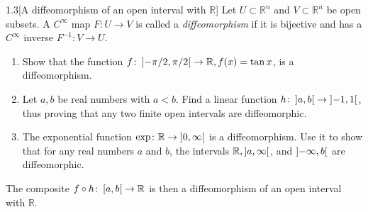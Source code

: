 \begin{problem}{1.3}[A diffeomorphism of an open interval with \(\mathbb{R}\)]
Let \(U\subset\mathbb{R}^{n}\) and \(V\subset\mathbb{R}^{n}\) be open subsets. A \(C^{\infty}\) map \(F\colon U\to V\) is called a \textit{diffeomorphism} if it is bijective and has a \(C^{\infty}\) inverse \(F^{-1}\colon V\to U\).
\begin{enumerate}[label={(\alph*)}]
    \item Show that the function \(f\colon\left\rbrack{-\pi/2,\pi/2}\right\lbrack\to\mathbb{R}, f(x)=\tan x\), is a diffeomorphism.
    \item Let \(a,b\) be real numbers with \(a<b\). Find a linear function \(h\colon\left\rbrack{a,b}\right\lbrack \to \left\rbrack{-1,1}\right\lbrack\), thus proving that any two finite open intervals are diffeomorphic.
    \item The exponential function \(\exp\colon\mathbb{R}\to\left\rbrack{0,\infty}\right\lbrack\) is a diffeomorphism. Use it to show that for any real numbers \(a\) and \(b\), the intervals \(\mathbb{R}, \left\rbrack{a,\infty}\right\lbrack\), and \(\left\rbrack{-\infty,b}\right\lbrack\) are diffeomorphic.
\end{enumerate}

The composite \(f\circ h\colon\left\lbrack{a,b}\right\lbrack\to\mathbb{R}\) is then a diffeomorphism of an open interval with \(\mathbb{R}\).
\end{problem}

